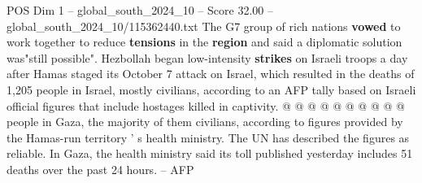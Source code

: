 \begin{textsample}{POS Dim 1 – global\_south\_2024\_10 – Score 32.00 – global\_south\_2024\_10/115362440.txt}
The G7 group of rich nations \textbf{vowed} to work together to reduce \textbf{tensions} in the \textbf{region} and said a diplomatic solution was"still possible".
Hezbollah began low-intensity \textbf{strikes} on Israeli troops a day after Hamas staged its October 7 attack on Israel, which resulted in the deaths of 1,205 people in Israel, mostly civilians, according to an AFP tally based on Israeli official figures that include hostages killed in captivity. @ @ @ @ @ @ @ @ @ @ people in Gaza, the majority of them civilians, according to figures provided by the Hamas-run territory ' s health ministry.
The UN has described the figures as reliable.
In Gaza, the health ministry said its toll published yesterday includes 51 deaths over the past 24 hours. -- AFP

\end{textsample}

